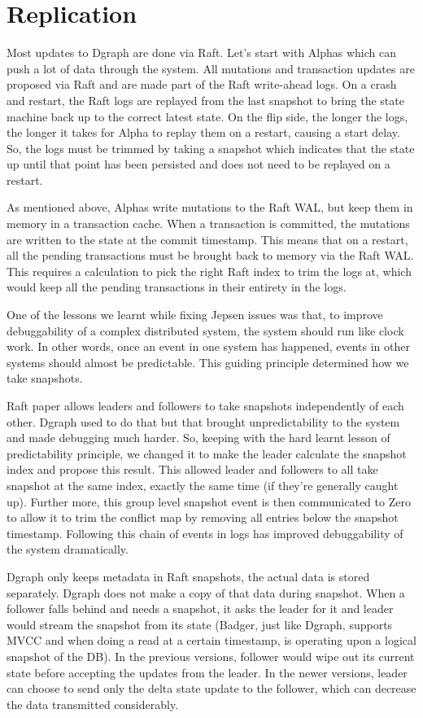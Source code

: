\documentclass[letterpaper,twocolumn,10pt]{article}
\begin{document}
\section{Replication}

Most updates to Dgraph are done via Raft. Let's start with Alphas which can push
a lot of data through the system. All mutations and transaction updates are
proposed via Raft and are made part of the Raft write-ahead logs. On a crash and
restart, the Raft logs are replayed from the last snapshot to bring the state
machine back up to the correct latest state. On the flip side, the longer the
logs, the longer it takes for Alpha to replay them on a restart, causing a start
delay. So, the logs must be trimmed by taking a snapshot which indicates that
the state up until that point has been persisted and does not need to be
replayed on a restart.

As mentioned above, Alphas write mutations to the Raft WAL, but keep them
in memory in a transaction cache. When a transaction is committed, the mutations
are written to the state at the commit timestamp. This means that on a restart,
all the pending transactions must be brought back to memory via the Raft WAL.
This requires a calculation to pick the right Raft index to trim the logs at,
which would keep all the pending transactions in their entirety in the logs.

One of the lessons we learnt while fixing Jepsen issues was that, to improve
debuggability of a complex distributed system, the system should run like clock
work. In other words, once an event in one system has happened, events in other
systems should almost be predictable. This guiding principle determined how we
take snapshots.

Raft paper allows leaders and followers to take snapshots independently of each
other. Dgraph used to do that but that brought unpredictability to the system
and made debugging much harder. So, keeping with the hard learnt lesson of
predictability principle, we changed it to make the leader calculate the
snapshot index and propose this result. This allowed leader and followers to all
take snapshot at the same index, exactly the same time (if they're generally
caught up). Further more, this group level snapshot event is then communicated
to Zero to allow it to trim the conflict map by removing all entries below the
snapshot timestamp. Following this chain of events in logs has improved
debuggability of the system dramatically.

Dgraph only keeps metadata in Raft snapshots, the actual data is stored
separately. Dgraph does not make a copy of that data during snapshot. When a
follower falls behind and needs a snapshot, it asks the leader for it and leader
would stream the snapshot from its state (Badger, just like Dgraph, supports
MVCC and when doing a read at a certain timestamp, is operating upon a logical
snapshot of the DB). In the previous versions, follower would wipe out its
current state before accepting the updates from the leader. In the newer
versions, leader can choose to send only the delta state update to the follower,
which can decrease the data transmitted considerably.
\end{document}
